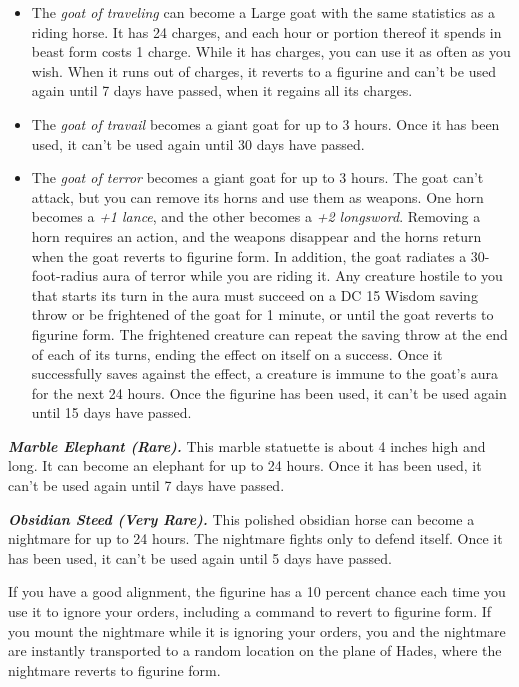 \documentclass[
]{article}
\begin{document}
\begin{itemize}
\item
  The \emph{goat of traveling} can become a Large goat with the same
  statistics as a riding horse. It has 24 charges, and each hour or
  portion thereof it spends in beast form costs 1 charge. While it has
  charges, you can use it as often as you wish. When it runs out of
  charges, it reverts to a figurine and can't be used again until 7 days
  have passed, when it regains all its charges.
\item
  The \emph{goat of travail} becomes a giant goat for up to 3 hours.
  Once it has been used, it can't be used again until 30 days have
  passed.
\item
  The \emph{goat of terror} becomes a giant goat for up to 3 hours. The
  goat can't attack, but you can remove its horns and use them as
  weapons. One horn becomes a \emph{+1 lance}, and the other becomes a
  \emph{+2 longsword}. Removing a horn requires an action, and the
  weapons disappear and the horns return when the goat reverts to
  figurine form. In addition, the goat radiates a 30-foot-radius aura of
  terror while you are riding it. Any creature hostile to you that
  starts its turn in the aura must succeed on a DC 15 Wisdom saving
  throw or be frightened of the goat for 1 minute, or until the goat
  reverts to figurine form. The frightened creature can repeat the
  saving throw at the end of each of its turns, ending the effect on
  itself on a success. Once it successfully saves against the effect, a
  creature is immune to the goat's aura for the next 24 hours. Once the
  figurine has been used, it can't be used again until 15 days have
  passed.
\end{itemize}

\emph{\textbf{Marble Elephant (Rare).}} This marble statuette is about 4
inches high and long. It can become an elephant for up to 24 hours. Once
it has been used, it can't be used again until 7 days have passed.

\emph{\textbf{Obsidian Steed (Very Rare).}} This polished obsidian horse
can become a nightmare for up to 24 hours. The nightmare fights only to
defend itself. Once it has been used, it can't be used again until 5
days have passed.

If you have a good alignment, the figurine has a 10 percent chance each
time you use it to ignore your orders, including a command to revert to
figurine form. If you mount the nightmare while it is ignoring your
orders, you and the nightmare are instantly transported to a random
location on the plane of Hades, where the nightmare reverts to figurine
form.
\end{document}
